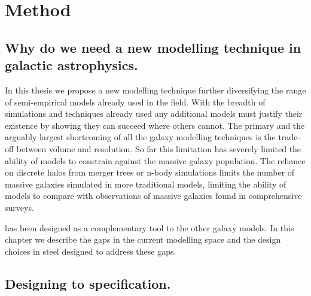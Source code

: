 
\chapter{Method} %
\label{Chapter:Method}

\section{Why do we need a new modelling technique in galactic astrophysics.}
In this thesis we propose a new modelling technique further diversifying the range of semi-empirical models already used in the field. With the breadth of simulations and techniques already used any additional models must justify their existence by showing they can succeed where others cannot. The primary and the arguably largest shortcoming of all the galaxy modelling techniques is the trade-off between volume and resolution. So far this limitation has severely limited the ability of models to constrain against the massive galaxy population. The reliance on discrete halos from merger trees or n-body simulations limits the number of massive galaxies simulated in more traditional models, limiting the ability of models to compare with observations of massive galaxies found in comprehensive surveys. 

\steel has been designed as a complementary tool to the other galaxy models. In this chapter we describe the gaps in the current modelling space and the design choices in steel designed to address these gaps.

\section{Designing to specification.}
